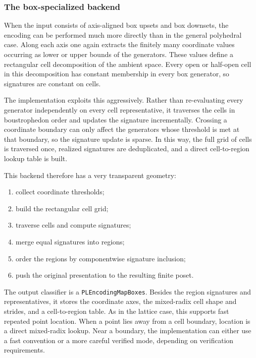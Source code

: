 \documentclass[11pt]{article}
\theoremstyle{definition}
\theoremstyle{remark}
\begin{document}
\subsubsection*{The box-specialized backend}

When the input consists of axis-aligned box upsets and box downsets, the encoding can be performed much more directly than in the general polyhedral case.  Along each axis one again extracts the finitely many coordinate values occurring as lower or upper bounds of the generators.  These values define a rectangular cell decomposition of the ambient space.  Every open or half-open cell in this decomposition has constant membership in every box generator, so signatures are constant on cells.

The implementation exploits this aggressively.  Rather than re-evaluating every generator independently on every cell representative, it traverses the cells in boustrophedon order and updates the signature incrementally.  Crossing a coordinate boundary can only affect the generators whose threshold is met at that boundary, so the signature update is sparse.  In this way, the full grid of cells is traversed once, realized signatures are deduplicated, and a direct cell-to-region lookup table is built.

This backend therefore has a very transparent geometry:
\begin{enumerate}[label=(\roman*)]
	\item collect coordinate thresholds;
	\item build the rectangular cell grid;
	\item traverse cells and compute signatures;
	\item merge equal signatures into regions;
	\item order the regions by componentwise signature inclusion;
	\item push the original presentation to the resulting finite poset.
\end{enumerate}

The output classifier is a \texttt{PLEncodingMapBoxes}.  Besides the region signatures and representatives, it stores the coordinate axes, the mixed-radix cell shape and strides, and a cell-to-region table.  As in the lattice case, this supports fast repeated point location.  When a point lies away from a cell boundary, location is a direct mixed-radix lookup.  Near a boundary, the implementation can either use a fast convention or a more careful verified mode, depending on verification requirements.
\end{document}
